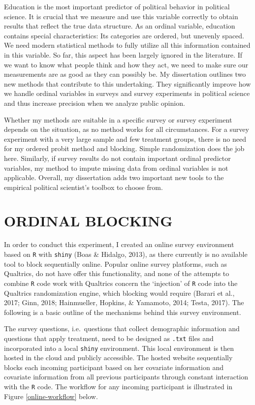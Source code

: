 \documentclass[12pt,econ]{sources/authesis}
\begin{document}
Education is the most important predictor of political behavior in political science. It is crucial that we measure and use this variable correctly to obtain results that reflect the true data structure. As an ordinal variable, education contains special characteristics: Its categories are ordered, but unevenly spaced. We need modern statistical methods to fully utilize all this information contained in this variable. So far, this aspect has been largely ignored in the literature. If we want to know what people think and how they act, we need to make sure our measurements are as good as they can possibly be. My dissertation outlines two new methods that contribute to this undertaking. They significantly improve how we handle ordinal variables in surveys and survey experiments in political science and thus increase precision when we analyze public opinion.

Whether my methods are suitable in a specific survey or survey experiment depends on the situation, as no method works for all circumstances. For a survey experiment with a very large sample and few treatment groups, there is no need for my ordered probit method and blocking. Simple randomization does the job here. Similarly, if survey results do not contain important ordinal predictor variables, my method to impute missing data from ordinal variables is not applicable. Overall, my dissertation adds two important new tools to the empirical political scientist's toolbox to choose from.

\appendix

\hypertarget{app-ordblock}{%
\chapter{ORDINAL BLOCKING}\label{app-ordblock}}

In order to conduct this experiment, I created an online survey environment based on \texttt{R} with \texttt{shiny} (Boas \& Hidalgo, 2013), as there currently is no available tool to block sequentially online. Popular online survey platforms, such as Qualtrics, do not have offer this functionality, and none of the attempts to combine \texttt{R} code work with Qualtrics concern the `injection' of \texttt{R} code into the Qualtrics randomization engine, which blocking would require (Barari et al., 2017; Ginn, 2018; Hainmueller, Hopkins, \& Yamamoto, 2014; Testa, 2017). The following is a basic outline of the mechanisms behind this survey environment.

The survey questions, i.e.~questions that collect demographic information and questions that apply treatment, need to be designed as \texttt{.txt} files and incorporated into a local \texttt{shiny} environment. This local environment is then hosted in the cloud and publicly accessible. The hosted website sequentially blocks each incoming participant based on her covariate information and covariate information from all previous participants through constant interaction with the \texttt{R} code. The workflow for any incoming participant is illustrated in Figure \ref{online-workflow} below.
\end{document}
